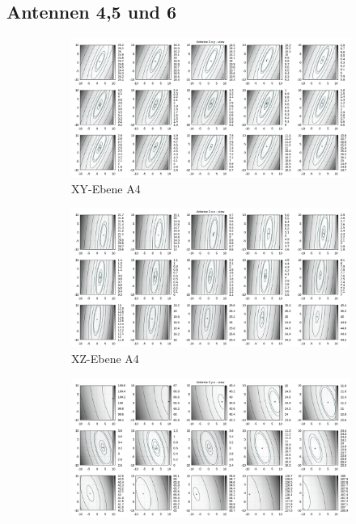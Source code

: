 \begin{appendix}
\begin{landscape}
\section{Antennen 4,5 und 6}
\begin{figure}[!ht]
	\centering
	\begin{subfigure}[t]{0.5\textwidth}
	     \centering
	     \includegraphics[width=\textwidth]{img/fitness/xy/a3.png}
	             \caption{XY-Ebene A4}
	\end{subfigure}
	\begin{subfigure}[t]{0.5\textwidth}
		\centering
	     \includegraphics[width=\textwidth]{img/fitness/xz/a3.png}
				\caption{XZ-Ebene A4}
	\end{subfigure}
	\begin{subfigure}[t]{0.5\textwidth}
			\centering
	   \includegraphics[width=\textwidth]{img/fitness/yz/a3.png}

\end{subfigure}
\end{figure}
\end{landscape}
\end{appendix}
